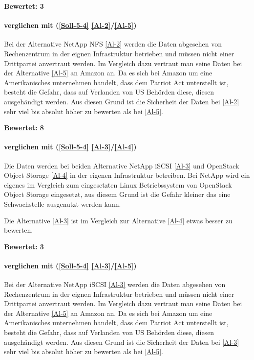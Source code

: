 \textbf{Bewertet: 3}

\paragraph*{  verglichen mit  (\ref{Soll-5-4} \ref{Al-2}/\ref{Al-5})}
Bei der Alternative NetApp NFS \ref{Al-2} werden die Daten abgesehen von Rechenzentrum in der eignen Infrastruktur betrieben und müssen nicht einer Drittpartei anvertraut werden. Im Vergleich dazu vertraut man seine Daten bei der Alternative \ref{Al-5} an Amazon an. Da es sich bei Amazon um eine Amerikanisches unternehmen handelt, dass dem Patriot Act unterstellt ist, besteht die Gefahr, dass auf Verlanden von US Behörden diese, diesen ausgehändigt werden. Aus diesen Grund ist die Sicherheit der Daten bei \ref{Al-2} sehr viel bis absolut höher zu bewerten als bei \ref{Al-5}.

\textbf{Bewertet: 8}

\paragraph*{  verglichen mit  (\ref{Soll-5-4} \ref{Al-3}/\ref{Al-4})}
Die Daten werden bei beiden Alternative NetApp iSCSI \ref{Al-3} und OpenStack Object Storage \ref{Al-4} in der eigenen Infrastruktur betreiben. Bei NetApp wird ein eigenes im Vergleich zum eingesetzten Linux Betriebssystem von OpenStack Object Storage eingesetzt, aus diesem Grund ist die Gefahr kleiner das eine Schwachstelle ausgenutzt werden kann.

Die Alternative  \ref{Al-3} ist im Vergleich zur Alternative  \ref{Al-4} etwas besser zu bewerten.

\textbf{Bewertet: 3}

\paragraph*{  verglichen mit  (\ref{Soll-5-4} \ref{Al-3}/\ref{Al-5})}
Bei der Alternative NetApp iSCSI \ref{Al-3} werden die Daten abgesehen von Rechenzentrum in der eignen Infrastruktur betrieben und müssen nicht einer Drittpartei anvertraut werden. Im Vergleich dazu vertraut man seine Daten bei der Alternative \ref{Al-5} an Amazon an. Da es sich bei Amazon um eine Amerikanisches unternehmen handelt, dass dem Patriot Act unterstellt ist, besteht die Gefahr, dass auf Verlanden von US Behörden diese, diesen ausgehändigt werden. Aus diesen Grund ist die Sicherheit der Daten bei  \ref{Al-3} sehr viel bis absolut höher zu bewerten als bei \ref{Al-5}.


